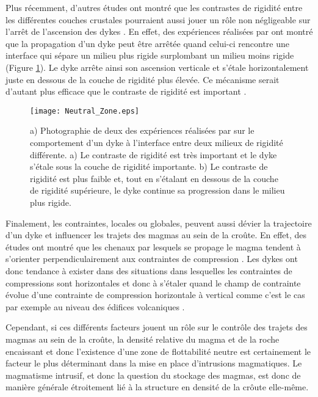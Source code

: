 Plus  récemment, d'autres  études  ont montré  que  les contrastes  de
rigidité  entre les  différentes  couches  crustales pourraient  aussi
jouer un  rôle non  négligeable sur l'arrêt  de l'ascension  des dykes
\citep{Menand:2011ki}.   En  effet,   des  expériences  réalisées  par
\citet{Kavanagh:2006ig} ont  montré que la propagation  d'un dyke peut
être  arrêtée quand  celui-ci rencontre  une interface  qui sépare  un
milieu  plus  rigide  surplombant   un  milieu  moins  rigide  (Figure
\ref{C1-Neutral_Zone}). Le  dyke arrête ainsi son  ascension verticale
et s'étale horizontalement  juste en dessous de la  couche de rigidité
plus  élevée.   Ce mécanisme  serait  d'autant  plus efficace  que  le
contraste de rigidité est important \citep{Kavanagh:2006ig}.

\begin{figure}[htpb]
  \begin{center}
    \graphicspath{ {/Users/thorey/Documents/These/Manuscript/Figure/Chapter1/} }
    \texttt{[image: Neutral\_Zone.eps]}
    \caption{a)  Photographie de  deux des  expériences réalisées  par
      \citet{Kavanagh:2006ig}   sur  le   comportement  d'un   dyke  à
      l'interface  entre deux  milieux de  rigidité différente.  a) Le
      contraste de rigidité est très important et le dyke s'étale sous
      la couche de  rigidité importante.  b) Le  contraste de rigidité
      est plus faible et, tout en s'étalant en dessous de la couche de
      rigidité  supérieure, le  dyke continue  sa progression  dans le
      milieu plus rigide.}
    \label{C1-Neutral_Zone}
  \end{center}
\end{figure}


Finalement, les contraintes, locales ou globales, peuvent aussi dévier
la trajectoire d'un dyke et influencer  les trajets des magmas au sein
de la  croûte.  En effet,  des études ont  montré que les  chenaux par
lesquels se propage le  magma tendent à s'orienter perpendiculairement
aux contraintes  de compression \citep{Anderson:L5JA3dNN}.   Les dykes
ont donc  tendance à exister  dans des situations dans  lesquelles les
contraintes de compressions sont horizontales et donc à s'étaler quand
le  champ  de  contrainte   évolue  d'une  contrainte  de  compression
horizontale à  vertical comme c'est le  cas par exemple au  niveau des
édifices volcaniques \citep{Pinel:2000wa,Pinel:2004ji,Roman:2014hw}.

Cependant, si ces  différents facteurs jouent un rôle  sur le contrôle
des trajets  des magmas au sein  de la croûte, la  densité relative du
magma et  de la  roche encaissant  et donc  l'existence d'une  zone de
flottabilité neutre  est certainement  le facteur le  plus déterminant
dans  la  mise  en  place  d'intrusions  magmatiques.   Le  magmatisme
intrusif, et  donc la  question du  stockage des  magmas, est  donc de
manière  générale étroitement  lié à  la  structure en  densité de  la
crôute elle-même.


